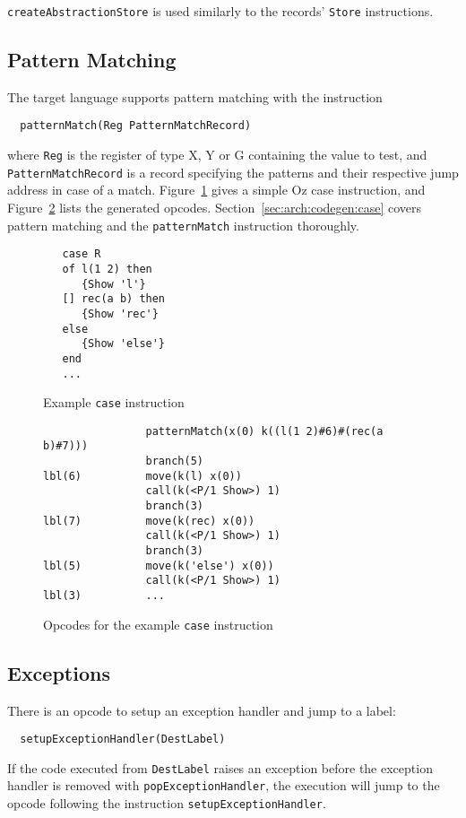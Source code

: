\documentclass[a4paper]{memoir}
\begin{document}
\lstinline!createAbstractionStore! is used similarly to the records'
\lstinline!Store! instructions.

\subsection{Pattern Matching}
The target language supports pattern matching with the instruction
\begin{lstlisting}
  patternMatch(Reg PatternMatchRecord)
\end{lstlisting}
where \lstinline!Reg! is the register of type X, Y or G containing the value to test, and
\lstinline!PatternMatchRecord! is a record specifying the patterns and their
respective jump address in case of a match.
Figure~\ref{fig:target:ozcase} gives a simple Oz case instruction, and Figure~\ref{fig:target:case} lists the generated opcodes.
Section~\ref{sec:arch:codegen:case} covers pattern matching and the \lstinline!patternMatch! instruction thoroughly.
 
\begin{figure}[ht]
\begin{lstlisting}
   case R
   of l(1 2) then
      {Show 'l'}
   [] rec(a b) then
      {Show 'rec'}
   else
      {Show 'else'}
   end
   ...
\end{lstlisting}
\caption{Example \lstinline!case! instruction}
\label{fig:target:ozcase}
\end{figure}

\begin{figure}[ht]
\begin{lstlisting}
                patternMatch(x(0) k((l(1 2)#6)#(rec(a b)#7)))
                branch(5)
lbl(6)          move(k(l) x(0))
                call(k(<P/1 Show>) 1)
                branch(3)
lbl(7)          move(k(rec) x(0))
                call(k(<P/1 Show>) 1)
                branch(3)
lbl(5)          move(k('else') x(0))
                call(k(<P/1 Show>) 1)
lbl(3)          ...
\end{lstlisting}
\caption{Opcodes for the example \lstinline!case! instruction}
\label{fig:target:case}
\end{figure}




\subsection{Exceptions}
There is an opcode to setup an exception handler and jump to a label:
\begin{lstlisting}
  setupExceptionHandler(DestLabel)
\end{lstlisting}
If the code executed from \lstinline!DestLabel! raises an exception before  the exception handler
is removed with \lstinline!popExceptionHandler!, the execution will jump to the
opcode following the instruction \lstinline!setupExceptionHandler!.
\end{document}
